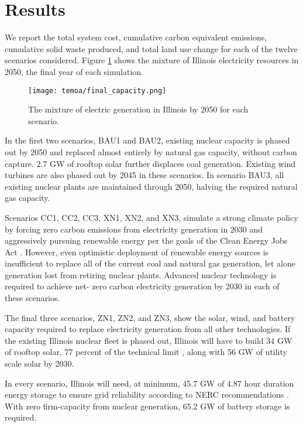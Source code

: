 \section{Results}\label{sec:results}

We report the total system cost, cumulative carbon equivalent emissions,
cumulative solid waste produced, and total land use change for each of the
twelve scenarios considered. Figure \ref{fig:cap-2050} shows the mixture of
Illinois electricity resources in 2050, the final year of each simulation.

\begin{figure}[H]
  \centering
  \texttt{[image: temoa/final\_capacity.png]}
  \caption{The mixture of electric generation in Illinois by 2050 for each scenario.}
  \label{fig:cap-2050}
\end{figure}

In the first two scenarios, BAU1 and BAU2, existing nuclear capacity is phased out
by 2050 and replaced almost entirely by natural gas capacity, without carbon
capture. 2.7 GW of rooftop solar further displaces coal generation.
Existing wind turbines are also phased out by 2045 in these scenarios. In
scenario BAU3, all existing nuclear plants are maintained through 2050, halving
the required natural gas capacity.

Scenarios CC1, CC2, CC3, XN1, XN2, and XN3, simulate a strong climate policy by
forcing zero carbon emissions from electricity generation in 2030 and
aggressively pursuing renewable energy per the goals of the Clean Energy Jobs
Act \cite{illinois_clean_jobs_coalition_clean_2021}. However, even optimistic
deployment of renewable energy sources is insufficient to replace all of the
current coal and natural gas generation, let alone generation lost from
retiring nuclear plants. Advanced nuclear technology is required to achieve net-
zero carbon electricity generation by 2030 in each of these scenarios.

The final three scenarios, ZN1, ZN2, and ZN3, show the solar, wind, and battery
capacity required to replace electricity generation from all other technologies.
If the existing Illinois nuclear fleet is phased out, Illinois will have to
build 34 GW of rooftop solar, 77 percent of the technical limit \cite{gagnon_rooftop_2016}, along with 56 GW of utility scale solar by 2030.

In every scenario, Illinois will need, at minimum, 45.7 GW of 4.87 hour duration
energy storage to ensure grid reliability according to NERC recommendations
\cite{milligan_methods_2011}. With zero firm-capacity from nuclear
generation, 65.2 GW of battery storage is required.

